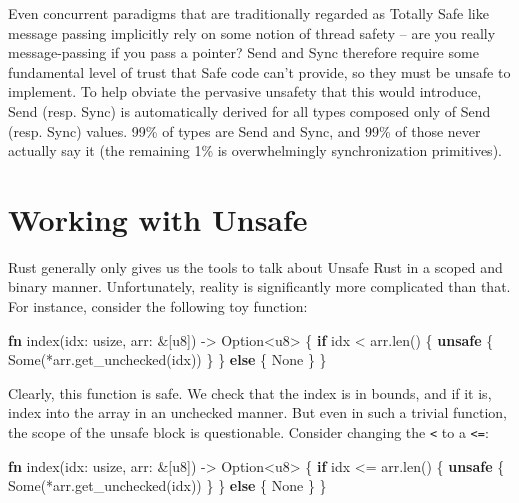 \documentclass[a4paper,]{book}
\newenvironment{Shaded}{\begin{snugshade}}{\end{snugshade}}
\newcommand{\KeywordTok}[1]{\textcolor[rgb]{0.13,0.29,0.53}{\textbf{{#1}}}}
\newcommand{\DataTypeTok}[1]{\textcolor[rgb]{0.13,0.29,0.53}{{#1}}}
\newcommand{\ConstantTok}[1]{\textcolor[rgb]{0.00,0.00,0.00}{{#1}}}
\newcommand{\NormalTok}[1]{{#1}}
\begin{document}
Even concurrent paradigms that are traditionally regarded as Totally
Safe like message passing implicitly rely on some notion of thread
safety -- are you really message-passing if you pass a pointer? Send and
Sync therefore require some fundamental level of trust that Safe code
can't provide, so they must be unsafe to implement. To help obviate the
pervasive unsafety that this would introduce, Send (resp. Sync) is
automatically derived for all types composed only of Send (resp. Sync)
values. 99\% of types are Send and Sync, and 99\% of those never
actually say it (the remaining 1\% is overwhelmingly synchronization
primitives).

\section{Working with Unsafe}\label{sec--working-with-unsafe}

Rust generally only gives us the tools to talk about Unsafe Rust in a
scoped and binary manner. Unfortunately, reality is significantly more
complicated than that. For instance, consider the following toy
function:

\begin{Shaded}
\begin{Highlighting}[]
\KeywordTok{fn} \NormalTok{index(idx: }\DataTypeTok{usize}\NormalTok{, arr: &[}\DataTypeTok{u8}\NormalTok{]) -> }\DataTypeTok{Option}\NormalTok{<}\DataTypeTok{u8}\NormalTok{> \{}
    \KeywordTok{if} \NormalTok{idx < arr.len() \{}
        \KeywordTok{unsafe} \NormalTok{\{}
            \ConstantTok{Some}\NormalTok{(*arr.get_unchecked(idx))}
        \NormalTok{\}}
    \NormalTok{\} }\KeywordTok{else} \NormalTok{\{}
        \ConstantTok{None}
    \NormalTok{\}}
\NormalTok{\}}
\end{Highlighting}
\end{Shaded}

Clearly, this function is safe. We check that the index is in bounds,
and if it is, index into the array in an unchecked manner. But even in
such a trivial function, the scope of the unsafe block is questionable.
Consider changing the \texttt{\textless{}} to a \texttt{\textless{}=}:

\begin{Shaded}
\begin{Highlighting}[]
\KeywordTok{fn} \NormalTok{index(idx: }\DataTypeTok{usize}\NormalTok{, arr: &[}\DataTypeTok{u8}\NormalTok{]) -> }\DataTypeTok{Option}\NormalTok{<}\DataTypeTok{u8}\NormalTok{> \{}
    \KeywordTok{if} \NormalTok{idx <= arr.len() \{}
        \KeywordTok{unsafe} \NormalTok{\{}
            \ConstantTok{Some}\NormalTok{(*arr.get_unchecked(idx))}
        \NormalTok{\}}
    \NormalTok{\} }\KeywordTok{else} \NormalTok{\{}
        \ConstantTok{None}
    \NormalTok{\}}
\NormalTok{\}}
\end{Highlighting}
\end{Shaded}
\end{document}
